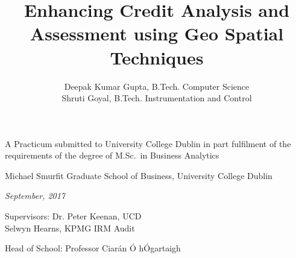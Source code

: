 \documentclass[a4paper,12pt,bibtotoc,notitlepage,oneside]{book}
\numberwithin{equation}{section}  %
\numberwithin{figure}{chapter}    %
\begin{document}
\frontmatter %

\title%
    {\bf Enhancing Credit Analysis and Assessment using Geo Spatial Techniques\\}

\author{Deepak Kumar Gupta, B.Tech. Computer Science \\ Shruti Goyal, B.Tech. Instrumentation and Control}  %
\date{}
\maketitle %

{\normalsize
\vfill
\begin{center}
\textup{A Practicum submitted to University College Dublin in part fulfilment
of the requirements of the degree of M.Sc.~in Business Analytics}
\end{center}
\vfill
\begin{center}
Michael Smurfit Graduate School of Business,
University College Dublin
\end{center}
\vfill
\begin{center}
\textit{September, 2017}
\end{center}
\vfill
\begin{center}
\textup{Supervisors: Dr. Peter Keenan, UCD \\ Selwyn Hearns, KPMG IRM Audit}
\end{center}
\vfill
\begin{center}
\textup{Head of School: Professor Ciar\'an \'O h\'Ogartaigh}
\end{center}
\vfill
}

\thispagestyle{empty} %

\clearpage %


\end{document}
